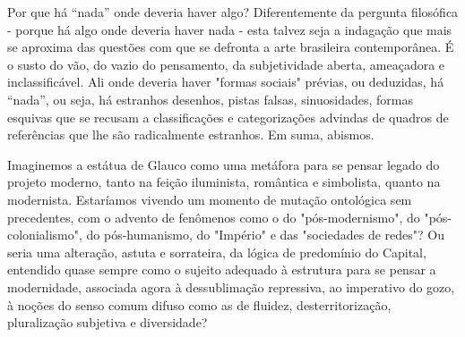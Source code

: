 \vspace*{1.5cm}
\bigskip

\hfill{}
\bigskip
\bigskip
\bigskip

\begin{multicols}{2}
\noindent{}Por que há ``nada'' onde deveria haver algo? Diferentemente da pergunta
filosófica - porque há algo onde deveria haver nada - esta talvez seja a
indagação que mais se aproxima das questões com que se defronta a arte
brasileira contemporânea. É o susto do vão, do vazio do pensamento, da
subjetividade aberta, ameaçadora e inclassificável. Ali onde deveria
haver "formas sociais" prévias, ou deduzidas, há ``nada'', ou seja, há
estranhos desenhos, pistas falsas, sinuosidades, formas esquivas que se
recusam a classificações e categorizações advindas de quadros de
referências que lhe são radicalmente estranhos. Em suma, abismos.


\vspace{\baselineskip}
{\small{}}
\vspace{\baselineskip}

Imaginemos a estátua de Glauco como uma metáfora para se pensar legado
do projeto moderno, tanto na feição iluminista, romântica e simbolista,
quanto na modernista. Estaríamos vivendo um momento de mutação
ontológica sem precedentes, com o advento de fenômenos como o do
"pós-modernismo", do "pós-colonialismo", do pós-humanismo, do "Império"
e das "sociedades de redes"? Ou seria uma alteração, astuta e
sorrateira, da lógica de predomínio do Capital, entendido quase sempre
como o sujeito adequado à estrutura para se pensar a modernidade,
associada agora à dessublimação repressiva, ao imperativo do gozo, à
noções do senso comum difuso como as de fluidez, desterritorização,
pluralização subjetiva e diversidade?


\end{multicols}
